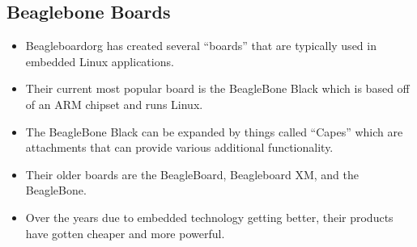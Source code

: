 \subsection{Beaglebone Boards}\label{beaglebone-boards}

\begin{itemize}
\itemsep1pt\parskip0pt
\item
  Beagleboardorg has created several ``boards'' that are typically used
  in embedded Linux applications.
\item
  Their current most popular board is the BeagleBone Black which is
  based off of an ARM chipset and runs Linux.
\item
  The BeagleBone Black can be expanded by things called ``Capes'' which
  are attachments that can provide various additional functionality.
\item
  Their older boards are the BeagleBoard, Beagleboard XM, and the
  BeagleBone.
\item
  Over the years due to embedded technology getting better, their
  products have gotten cheaper and more powerful.
\end{itemize}
